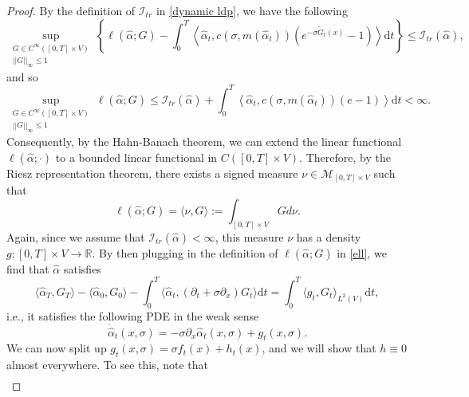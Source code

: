 \documentclass[11pt]{article}
\numberwithin{equation}{section}
\theoremstyle{definition}
\theoremstyle{plain}
\newcommand{\dd}{\mathrm{d}}
\begin{document}
\begin{proof}
By the definition of $\mathcal{I}_{tr}$ in \eqref{dynamic ldp}, we have the following 
    \begin{equation}
        \sup_{\substack{G \in C^\infty([0,T]\times V)\\||G||_\infty\leq 1}} \left\{\ell(\widehat{\alpha};G) - \int_0^T \left\langle \widehat{\alpha}_t, c(\sigma,m(\widehat{\alpha}_t))\left( e^{-\sigma \widetilde{G}_t(x)}-1\right)\right\rangle \dd t\right\}\leq \mathcal{I}_{tr}(\widehat{\alpha}),
    \end{equation}
and so
    \begin{equation}
         \sup_{\substack{G \in C^\infty([0,T]\times V)\\||G||_\infty\leq 1}} \ell(\widehat{\alpha};G) \leq \mathcal{I}_{tr}(\widehat{\alpha}) + \int_0^T \left\langle \widehat{\alpha}_t, c(\sigma,m(\widehat{\alpha}_t))\left( e-1\right)\right\rangle \dd t < \infty.
    \end{equation}
Consequently, by the Hahn-Banach theorem, we can extend the linear functional $\ell(\widehat{\alpha};\cdot)$ to a bounded linear functional in $C([0,T]\times V)$. Therefore, by the Riesz representation theorem, there exists a signed measure $\nu \in \mathcal{M}_{[0,T]\times V}$ such that 
    \begin{equation}
        \ell(\widehat{\alpha}; G) = \langle \nu, G\rangle := \int_{[0,T]\times V} G d\nu.
    \end{equation}
Again, since we assume that $\mathcal{I}_{tr}(\widehat{\alpha})<\infty$,  this measure $\nu$ has a density $g:[0,T]\times V \to \mathbb{R}$. By then plugging in the definition of $\ell(\widehat{\alpha};G)$ in \eqref{ell}, we find that $\widehat{\alpha}$ satisfies
    \begin{equation}
         \langle \widehat{\alpha}_T, G_T\rangle - \langle \widehat{\alpha}_0, G_0\rangle - \int_0^T \langle \widehat{\alpha}_t, (\partial_t + \sigma \partial_x) G_t\rangle \dd t = \int_0^T \langle g_t, G_t \rangle_{L^2(V)} \dd t,
    \end{equation}
i.e., it satisfies the following PDE in the weak sense
    \begin{equation}
        \dot{\widehat{\alpha}}_t(x,\sigma) = -\sigma \partial_x \widehat{\alpha}_t(x,\sigma) + g_t(x,\sigma).
    \end{equation}
We can now split up  $g_t(x,\sigma) = \sigma f_t(x) + h_t(x)$, and we will show that $h\equiv 0$ almost everywhere. To see this, note that 
    \begin{align}

\end{align}
\end{proof}
\end{document}
